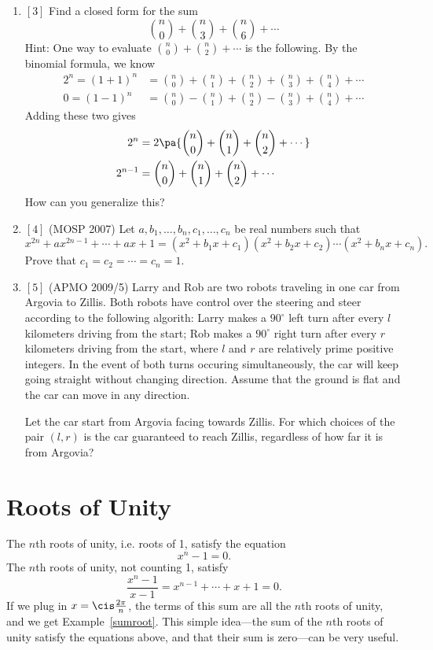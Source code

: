 \begin{enumerate}
\item $[3]$ Find a closed form for the sum
\[\binom n0+\binom n3+\binom n6+\cdots \]
Hint: One way to evaluate $\binom n0+\binom n2+\cdots $ is the following. By the binomial formula, we know
\begin{align*}
2^n=(1+1)^n&=\binom n0+\binom n1+\binom n2+\binom n3+\binom n4+\cdots\\
0=(1-1)^n&=\binom n0-\binom n1+\binom n2-\binom n3+\binom n4+\cdots
\end{align*}
Adding these two gives
\begin{align*}
2^n&=2\pa{\binom n0+\binom n1+\binom n2+\cdots}\\
2^{n-1}&=\binom n0+\binom n1+\binom n2+\cdots
\end{align*}
How can you generalize this?
\item $[4]$ (MOSP 2007) Let $a,b_1,\ldots, b_n,c_1,\ldots, c_n$ be real numbers such that \[x^{2n}+ax^{2n-1}+\cdots +ax+1=(x^2+b_1x+c_1)(x^2+b_2x+c_2)\cdots (x^2+b_nx+c_n).\]
Prove that $c_1=c_2=\cdots =c_n=1$.
\item $[5]$ (APMO 2009/5) Larry and Rob are two robots traveling in one car from Argovia to Zillis. Both robots have control over the steering and steer according to the following algorith: Larry makes a $90^{\circ}$ left turn after every $l$ kilometers driving from the start; Rob makes a $90^{\circ}$ right turn after every $r$ kilometers driving from the start, where $l$ and $r$ are relatively prime positive integers. In the event of both turns occuring simultaneously, the car will keep going straight without changing direction. Assume that the ground is flat and the car can move in any direction.

Let the car start from Argovia facing towards Zillis. For which choices of the pair $(l,r)$ is the car guaranteed to reach Zillis, regardless of how far it is from Argovia?
\end{enumerate}
\section{Roots of Unity}
The $n$th roots of unity, i.e. roots of 1, satisfy the equation
\[x^n-1=0.\]
The $n$th roots of unity, not counting 1, satisfy
\[\frac{x^n-1}{x-1}=x^{n-1}+\cdots +x+1=0.\]
If we plug in $x=\cis \frac{2\pi}{n}$, the terms of this sum are all the $n$th roots of unity, and we get Example~\ref{sumroot}. This simple idea---the sum of the $n$th roots of unity satisfy the equations above, and that their sum is zero---can be very useful.

